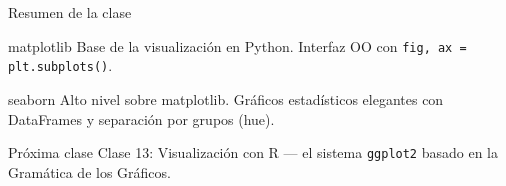 \documentclass[aspectratio=169]{beamer}
\begin{document}
\begin{frame}{Resumen de la clase}
  \begin{block}{matplotlib}
    Base de la visualización en Python. Interfaz OO con \texttt{fig, ax = plt.subplots()}.
  \end{block}
  \bigskip
  \begin{block}{seaborn}
    Alto nivel sobre matplotlib. Gráficos estadísticos elegantes con DataFrames y separación por grupos (hue).
  \end{block}
  \bigskip
  \begin{block}{Próxima clase}
    Clase 13: Visualización con R — el sistema \texttt{ggplot2} basado en la Gramática de los Gráficos.
  \end{block}
\end{frame}
\end{document}
